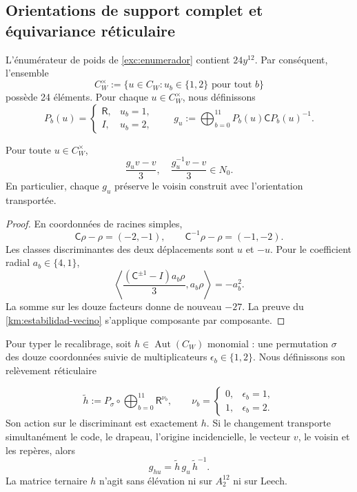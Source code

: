 \subsection{Orientations de support complet et équivariance réticulaire}
\label{paper:24-orientaciones}

L’énumérateur de poids de \eqref{exc:enumerador} contient
\(24y^{12}\). Par conséquent, l’ensemble
\[
 C_W^\times:=
 \{u\in C_W:u_b\in\{1,2\}\text{ pour tout }b\}
\]
possède 24 éléments. Pour chaque \(u\in C_W^\times\), nous définissons
\[
 P_b(u)=
 \begin{cases}
  \mathsf R,&u_b=1,\\
  I,&u_b=2,
 \end{cases}
 \qquad
 g_u:=\bigoplus_{b=0}^{11}P_b(u)\mathsf C P_b(u)^{-1}.
\]

\begin{proposition}
\label{paper:robustez-orientaciones}
Pour toute \(u\in C_W^\times\),
\[
 \frac{g_uv-v}{3},
 \quad
 \frac{g_u^{-1}v-v}{3}
 \in N_0.
\]
En particulier, chaque \(g_u\) préserve le voisin construit avec
l’orientation transportée.

\end{proposition}

\begin{proof}
En coordonnées de racines simples,
\[
 \mathsf C\rho-\rho=(-2,-1),
 \qquad
 \mathsf C^{-1}\rho-\rho=(-1,-2).
\]
Les classes discriminantes des deux déplacements sont \(u\) et \(-u\).
Pour le coefficient radial \(a_b\in\{4,1\}\),
\[
 \left\langle
 \frac{(\mathsf C^{\pm1}-I)a_b\rho}{3},a_b\rho
 \right\rangle=-a_b^2.
\]
La somme sur les douze facteurs donne de nouveau \(-27\). La preuve du
\cref{km:estabilidad-vecino} s’applique composante par
composante.
\end{proof}

Pour typer le recalibrage, soit
\(h\in\operatorname{Aut}(C_W)\) monomial : une permutation \(\sigma\) des
douze coordonnées suivie de multiplicateurs
\(\epsilon_b\in\{1,2\}\). Nous définissons son relèvement réticulaire

\begin{equation}
 \widetilde h
 :=P_\sigma\circ
 \bigoplus_{b=0}^{11}\mathsf R^{\nu_b},
 \qquad
 \nu_b=
 \begin{cases}
 0,&\epsilon_b=1,\\
 1,&\epsilon_b=2.
 \end{cases}
 \label{paper:elevacion-monomial}
\end{equation}
Son action sur le discriminant est exactement \(h\). Si le changement transporte
simultanément le code, le drapeau, l’origine incidencielle, le vecteur \(v\), le voisin et les
repères, alors
\begin{equation}
 g_{hu}=\widetilde h\,g_u\,\widetilde h^{-1}.
 \label{paper:naturalidad-isometrias}
\end{equation}
La matrice ternaire \(h\) n’agit sans élévation ni sur \(A_2^{12}\) ni sur
Leech.

